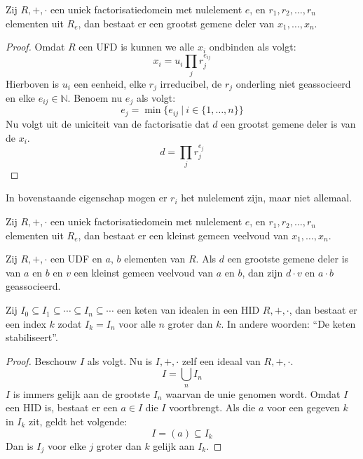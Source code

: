 \documentclass[main.tex]{subfiles}
\begin{document}
\begin{ei}
  Zij $R,+,\cdot$ een uniek factorisatiedomein met nulelement $e$, en $r_{1},r_{2},\dotsc,r_{n}$ elementen uit $R_{e}$, dan bestaat er een grootst gemene deler van $x_{1},\dotsc,x_{n}$.
  \begin{proof}
    Omdat $R$ een UFD is kunnen we alle $x_{i}$ ondbinden als volgt:
    \[ x_{i} = u_{i}\prod_{j}r_{j}^{e_{ij}} \]
    Hierboven is $u_{i}$ een eenheid, elke $r_{j}$ irreducibel, de $r_{j}$ onderling niet geassocieerd en elke $e_{ij}\in \mathbb{N}$.
    Benoem nu $e_{j}$ als volgt:
    \[ e_{j} = \min \{ e_{ij} \ |\ i \in \{ 1,\dotsc, n\} \} \]
    Nu volgt uit de uniciteit van de factorisatie dat $d$ een grootst gemene deler is van de $x_{i}$.
    \[ d = \prod_{j}r_{j}^{e_{j}}\]
  \end{proof}
\end{ei}

\begin{opm}
  In bovenstaande eigenschap mogen er $r_{i}$ het nulelement zijn, maar niet allemaal.
\end{opm}

\begin{ei}
  Zij $R,+,\cdot$ een uniek factorisatiedomein met nulelement $e$, en $r_{1},r_{2},\dotsc,r_{n}$ elementen uit $R_{e}$, dan bestaat er een kleinst gemeen veelvoud van $x_{1},\dotsc,x_{n}$.
\end{ei}

\begin{st}
  Zij $R,+,\cdot$ een UDF en $a$, $b$ elementen van $R$.
  Als $d$ een grootste gemene deler is van $a$ en $b$ en $v$ een kleinst gemeen veelvoud van $a$ en $b$, dan zijn $d\cdot v$ en $a\cdot b$ geassocieerd.
\end{st}

\begin{lem}
  \label{lem:hid-keten-van-idealen-stabiliseert}
  Zij $I_{0} \subseteq I_{1} \subseteq \dotsb \subseteq I_{n} \subseteq \dotsb $ een keten van idealen in een HID $R,+,\cdot$, dan bestaat er een index $k$ zodat $I_{k} = I_{n}$ voor alle $n$ groter dan $k$.
  In andere woorden: ``De keten stabiliseert''.

  \begin{proof}
    Beschouw $I$ als volgt.
    Nu is $I,+,\cdot$ zelf een ideaal van $R,+,\cdot$. 
    \[ I = \bigcup_{n}I_{n} \]
    $I$ is immers gelijk aan de grootste $I_{n}$ waarvan de unie genomen wordt.
    Omdat $I$ een HID is, bestaat er een $a\in I$ die $I$ voortbrengt.
    Als die $a$ voor een gegeven $k$ in $I_{k}$ zit, geldt het volgende:
    \[ I = (a) \subseteq I_{k} \]
    Dan is $I_{j}$ voor elke $j$ groter dan $k$ gelijk aan $I_{k}$.
  \end{proof}
\end{lem}
\end{document}
